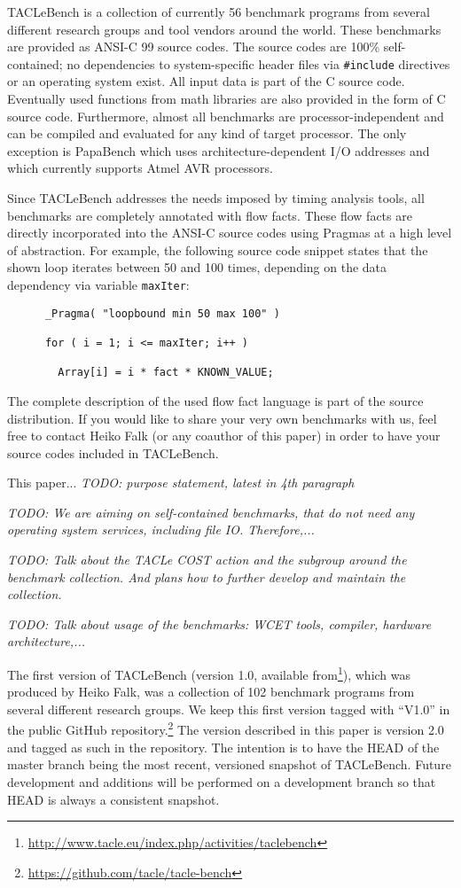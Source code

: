 \documentclass[a4paper,UKenglish]{oasics}
\newcommand{\todo}[1]{{\emph{TODO: #1}}}
\newcommand{\code}[1]{{\small{\texttt{#1}}}}
\begin{document}
TACLeBench is a collection of currently 56 benchmark programs
from several different research groups and tool vendors around the world.
These benchmarks are provided as ANSI-C 99 source codes.
The source codes are 100\% self-contained; no dependencies to system-specific
header files via \code{\#include} directives or an operating system exist.
All input data is part of the C source code.
Eventually used functions from math libraries are also provided in the form of C source code. Furthermore, almost all benchmarks are processor-independent and can
be compiled and evaluated for any kind of target processor.
The only exception is PapaBench which uses architecture-dependent
I/O addresses and which currently supports Atmel AVR processors.

Since TACLeBench addresses the needs imposed by timing analysis tools,
all benchmarks are completely annotated with flow facts.
These flow facts are directly incorporated into the ANSI-C source codes using
Pragmas at a high level of abstraction.
For example, the following source code snippet states that the shown loop
iterates between 50 and 100 times, depending on the data dependency
via variable \code{maxIter}:

\begin{verbatim}
      _Pragma( "loopbound min 50 max 100" )

      for ( i = 1; i <= maxIter; i++ )

        Array[i] = i * fact * KNOWN_VALUE;

\end{verbatim}


The complete description of the used flow fact language is part of the source
distribution. If you would like to share your very own benchmarks with us,
feel free to contact Heiko Falk (or any coauthor of this paper) in order
to have your source codes included in TACLeBench.


This paper... \todo{purpose statement, latest in 4th paragraph}

\todo{We are aiming on self-contained benchmarks, that do not need any
operating system services, including file IO. Therefore,...}

\todo{Talk about the TACLe COST action and the subgroup around the benchmark
collection. And plans how to further develop and maintain the collection.}

\todo{Talk about usage of the benchmarks: WCET tools, compiler, hardware
architecture,...}

The first version of TACLeBench (version 1.0, available
from\footnote{\url{http://www.tacle.eu/index.php/activities/taclebench}}), which was produced
by Heiko Falk, was a collection of 102 benchmark programs from several different
research groups. We keep this first version tagged with ``V1.0'' in the public
GitHub repository.\footnote{\url{https://github.com/tacle/tacle-bench}}
The version described in this paper is version 2.0 and tagged as such in the
repository.
The intention is to have the HEAD of the master branch being
the most recent, versioned snapshot of TACLeBench.
Future development and additions will be performed on a development
branch so that HEAD is always a consistent snapshot.
\end{document}
